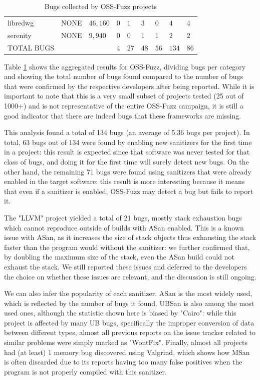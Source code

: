 \begin{table}[h!]
{\begin{tabular}{|l|l|l|l|l|l|l|l|l|}
libredwg         & NONE                & $46,160$            & $0$              & $1$           & $3$           & $0$            & $4$             & $4$                 \\
serenity         & NONE                & $9,940$             & $0$              & $0$           & $1$           & $1$            & $2$             & $2$                 \\
\hline
TOTAL BUGS   &   &   &$4$   &$27$   &$48$   &$56$   &$134$   &$86$       \\
\hline
\end{tabular}}
\vspace{10pt}
\caption{Bugs collected by OSS-Fuzz projects}
\label{ossfuzz-table}
\end{table}
Table \ref{ossfuzz-table} shows the aggregated results for OSS-Fuzz, dividing bugs per category and showing the total number of bugs found compared to the number of bugs that were confirmed by the respective developers after being reported. While it is important to note that this is a very small subset of projects tested (25 out of 1000+) and is not representative of the entire OSS-Fuzz campaign, it is still a good indicator that there are indeed bugs that these frameworks are missing.

This analysis found a total of 134 bugs (an average of 5.36 bugs per project). In total, 63 bugs out of 134 were found by enabling new sanitizers for the first time in a project: this result is expected since that software was never tested for that class of bugs, and doing it for the first time will surely detect new bugs. On the other hand, the remaining 71 bugs were found using sanitizers that were already enabled in the target software: this result is more interesting because it means that even if a sanitizer is enabled, OSS-Fuzz may detect a bug but fails to report it.

The "LLVM" project yielded a total of 21 bugs, mostly stack exhaustion bugs which cannot reproduce outside of builds with ASan enabled. This is a known issue with ASan, as it increases the size of stack objects thus exhausting the stack faster than the program would without the sanitizer: we further confirmed that, by doubling the maximum size of the stack, even the ASan build could not exhaust the stack. We still reported these issues and deferred to the developers the choice on whether these issues are relevant, and the discussion is still ongoing.

We can also infer the popularity of each sanitizer. ASan is the most widely used, which is reflected by the number of bugs it found. UBSan is also among the most used ones, although the statistic shown here is biased by "Cairo": while this project is affected by many UB bugs, specifically the improper conversion of data between different types, almost all previous reports on the issue tracker related to similar problems were simply marked as "WontFix". Finally, almost all projects had (at least) 1 memory bug discovered using Valgrind, which shows how MSan is often discarded due to its reports having too many false positives when the program is not properly compiled with this sanitizer. 



